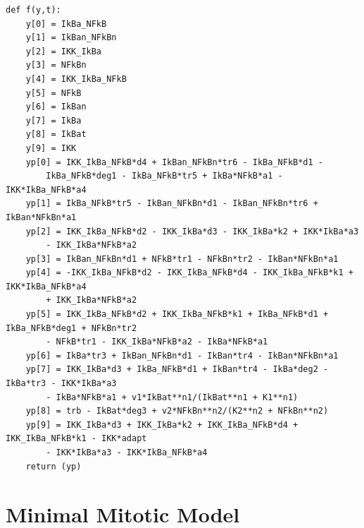\begin{changemargin}{0.3in}{1in}
\begin{scriptsize}
\begin{Verbatim}[frame=single,xrightmargin=\leftmargin]
def f(y,t):
    y[0] = IkBa_NFkB
    y[1] = IkBan_NFkBn
    y[2] = IKK_IkBa
    y[3] = NFkBn
    y[4] = IKK_IkBa_NFkB
    y[5] = NFkB
    y[6] = IkBan
    y[7] = IkBa
    y[8] = IkBat
    y[9] = IKK
    yp[0] = IKK_IkBa_NFkB*d4 + IkBan_NFkBn*tr6 - IkBa_NFkB*d1 - 
    	IkBa_NFkB*deg1 - IkBa_NFkB*tr5 + IkBa*NFkB*a1 - IKK*IkBa_NFkB*a4
    yp[1] = IkBa_NFkB*tr5 - IkBan_NFkBn*d1 - IkBan_NFkBn*tr6 + IkBan*NFkBn*a1
    yp[2] = IKK_IkBa_NFkB*d2 - IKK_IkBa*d3 - IKK_IkBa*k2 + IKK*IkBa*a3 
    	- IKK_IkBa*NFkB*a2
    yp[3] = IkBan_NFkBn*d1 + NFkB*tr1 - NFkBn*tr2 - IkBan*NFkBn*a1
    yp[4] = -IKK_IkBa_NFkB*d2 - IKK_IkBa_NFkB*d4 - IKK_IkBa_NFkB*k1 + IKK*IkBa_NFkB*a4 
    	+ IKK_IkBa*NFkB*a2
    yp[5] = IKK_IkBa_NFkB*d2 + IKK_IkBa_NFkB*k1 + IkBa_NFkB*d1 + IkBa_NFkB*deg1 + NFkBn*tr2 
    	- NFkB*tr1 - IKK_IkBa*NFkB*a2 - IkBa*NFkB*a1
    yp[6] = IkBa*tr3 + IkBan_NFkBn*d1 - IkBan*tr4 - IkBan*NFkBn*a1
    yp[7] = IKK_IkBa*d3 + IkBa_NFkB*d1 + IkBan*tr4 - IkBa*deg2 - IkBa*tr3 - IKK*IkBa*a3 
    	- IkBa*NFkB*a1 + v1*IkBat**n1/(IkBat**n1 + K1**n1)
    yp[8] = trb - IkBat*deg3 + v2*NFkBn**n2/(K2**n2 + NFkBn**n2)
    yp[9] = IKK_IkBa*d3 + IKK_IkBa*k2 + IKK_IkBa_NFkB*d4 + IKK_IkBa_NFkB*k1 - IKK*adapt 
    	- IKK*IkBa*a3 - IKK*IkBa_NFkB*a4
    return (yp)
\end{Verbatim}
\end{scriptsize}
\end{changemargin}

\pagebreak
\section{Minimal Mitotic Model}
\label{section:Goldbeter}

